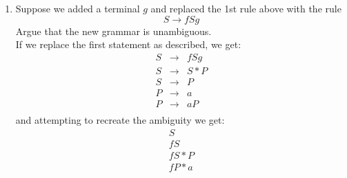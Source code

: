 \documentclass[12pt]{article}
\begin{document}
\begin{enumerate}
\begin{enumerate}
  The string $fa*a$ can be derived in two ways as shown:
  \[
    \begin{array}{l}
      S\\
      fS\\
      fS*P\\
      fP*a\\
      fa*a\\
    \end{array}
  \]
  \[
    \begin{tikzpicture}
      \tikzstyle{level 1}=[sibling distance =2cm]
      \tikzstyle{level 2}=[sibling distance =1cm]
      \GraphInit[vstyle=Empty]
      \SetVertexMath
      \node{$S$}
      child{node{$f$}}
      child{node{$S$}
        child{node{$S$}
          child{node{$P$}
            child{node{$a$}}
          }
        }
        child{node{$*$}}
        child{node{$P$}
          child{node{$a$}}
        }
      };
    \end{tikzpicture}
    \begin{tikzpicture}
      \tikzstyle{level 1}=[sibling distance =1cm]
      \tikzstyle{level 2}=[sibling distance =1cm]
      \GraphInit[vstyle=Empty]
      \SetVertexMath
      \node{$S$}
      child{node[anchor=east]{$S$}
        child{node{$f$}}
        child{node{$S$}
          child{node{$P$}
            child{node{$a$}}
          }
        }
      }
      child{node{$*$}}
      child{node{$P$}
        child{node{$a$}}
      };
    \end{tikzpicture}
  \]
  \newpage
  \item Suppose we added a terminal $g$ and replaced the 1st rule above with the rule
  \[ S \rightarrow fSg \]
  Argue that the new grammar is unambiguous. \\
  If we replace the first statement as described, we get:
  \[
    \begin{array}{lll}
      S & \rightarrow & fSg \\
      S & \rightarrow & S*P \\
      S & \rightarrow & P \\
      P & \rightarrow & a \\
      P & \rightarrow & aP \\
    \end{array}
  \]
  and attempting to recreate the ambiguity we get:
    \[
    \begin{array}{l}
      S\\
      fS\\
      fS*P\\
      fP*a\\

\end{array}\]
\end{enumerate}
\end{enumerate}
\end{document}
